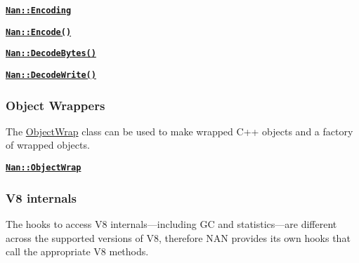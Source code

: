 \begin{DoxyItemize}
\item \href{doc/string_bytes.md#api_nan_encoding}{\tt {\bfseries {\ttfamily Nan\+::\+Encoding}}}
\item \href{doc/string_bytes.md#api_nan_encode}{\tt {\bfseries {\ttfamily Nan\+::\+Encode()}}}
\item \href{doc/string_bytes.md#api_nan_decode_bytes}{\tt {\bfseries {\ttfamily Nan\+::\+Decode\+Bytes()}}}
\item \href{doc/string_bytes.md#api_nan_decode_write}{\tt {\bfseries {\ttfamily Nan\+::\+Decode\+Write()}}}
\end{DoxyItemize}

\subsubsection*{Object Wrappers}

The {\ttfamily \hyperlink{class_object_wrap}{Object\+Wrap}} class can be used to make wrapped C++ objects and a factory of wrapped objects.


\begin{DoxyItemize}
\item \href{doc/object_wrappers.md#api_nan_object_wrap}{\tt {\bfseries {\ttfamily Nan\+::\+Object\+Wrap}}}
\end{DoxyItemize}

\subsubsection*{V8 internals}

The hooks to access V8 internals—including GC and statistics—are different across the supported versions of V8, therefore N\+AN provides its own hooks that call the appropriate V8 methods.


